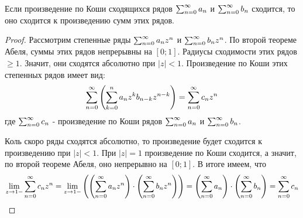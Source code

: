 \begin{corollary}
	Если произведение по Коши сходящихся рядов $\sum_{n = 0}^\infty a_n$ и $\sum_{n = 0}^\infty b_n$ сходится, то оно сходится к произведению сумм этих рядов.
\end{corollary}

\begin{proof}
	Рассмотрим степенные ряды $\sum_{n = 0}^\infty a_n z^n$ и $\sum_{n = 0}^\infty b_n z^n$. По второй теореме Абеля, суммы этих рядов непрерывны на $[0; 1]$. Радиусы сходимости этих рядов $\ge 1$. Значит, они сходятся абсолютно при $|z| < 1$. Произведение по Коши этих степенных рядов имеет вид:
	\[
		\sum_{n = 0}^\infty \left(\sum\limits_{k = 0}^n a_n z^k b_{n - k} z^{n - k}\right) = \sum\limits_{n = 0}^\infty c_n z^n
	\]
	где $\sum_{n = 0}^\infty c_n$ - произведение по Коши рядов $\sum_{n = 0}^\infty a_n$ и $\sum_{n = 0}^\infty b_n$.
	
	Коль скоро ряды сходятся абсолютно, то произведение будет сходится к произведению при $|z| < 1$. При $|z| = 1$ произведение по Коши сходится, а значит, по второй теореме Абеля, оно непрерывно на $[0; 1]$. В итоге имеем, что
	\[
		\lim\limits_{z \to 1-} \sum_{n = 0}^\infty c_n z^n = \lim\limits_{z \to 1-} \left(\left(\sum_{n = 0}^\infty a_n z^n\right) \cdot \left(\sum_{n = 0}^\infty b_n z^n\right)\right) = \left(\sum_{n = 0}^\infty a_n\right) \cdot \left(\sum_{n = 0}^\infty b_n\right) = \sum_{n = 0}^\infty c_n
	\]
\end{proof}